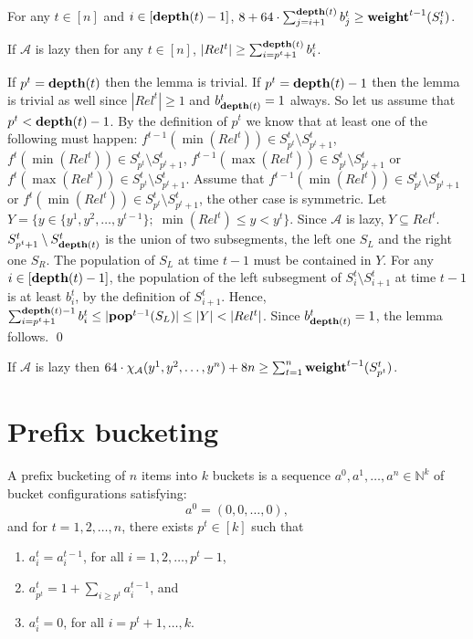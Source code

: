 \documentclass[runningheads,a4paper]{llncs}
\newcommand{\A}{\mathcal{A}}
\newcommand{\N}{\mathbb{N}}
\newcommand{\pop}{{\rm {\bf pop}}}
\newcommand{\weight}{{\rm {\bf weight}}}
\newcommand{\depth}{{\rm {\bf depth}}}
\renewenvironment{proof}{\noindent{\it Proof. }} {{\qed}}
\begin{document}
\begin{corollary}\label{c-weight}
For any $t\in[n]$ and $i\in[\depth(t)-1]$, $8 + 64 \cdot \sum_{j=i+1}^{\depth(t)} b^t_{j} \ge \weight^{t-1}(S^t_i)$.
\end{corollary}


\begin{lemma}
If $\A$ is lazy then for any $t\in[n]$, $|Rel^t| \ge \sum_{i=p^t+1}^{\depth(t)} b^t_i$.
\end{lemma}

\begin{proof}
If $p^t = \depth(t)$ then the lemma is trivial. If $p^t = \depth(t)-1$ then the lemma is trivial as well
since $|Rel^t|\ge 1$ and $b^t_{\depth(t)}=1$ always. So let us assume that $p^t < \depth(t)-1$.
By the definition of $p^t$ we know that at least one of the following must happen: $f^{t-1}(\min(Rel^t)) \in S^t_{p^t} \setminus S^t_{p^t+1}$, $f^{t}(\min(Rel^t)) \in S^t_{p^t} \setminus S^t_{p^t+1}$, $f^{t-1}(\max(Rel^t)) \in S^t_{p^t} \setminus S^t_{p^t+1}$ or $f^{t}(\max(Rel^t)) \in S^t_{p^t} \setminus S^t_{p^t+1}$. Assume that $f^{t-1}(\min(Rel^t)) \in S^t_{p^t} \setminus S^t_{p^t+1}$ or $f^{t}(\min(Rel^t)) \in S^t_{p^t} \setminus S^t_{p^t+1}$,
the other case is symmetric. Let $Y = \{ y \in \{y^1,y^2,\dots,y^{t-1}\};\; \min(Rel^t) \le y < y^t\}$. 
Since $\A$ is lazy,  $Y \subseteq Rel^t$. $S^t_{p^t+1} \setminus S^t_{\depth(t)}$ is the union of two subsegments, the left one $S_L$ and the right one $S_R$.
The population of $S_L$ at time $t-1$ must be contained in $Y$.
For any $i\in [\depth(t)-1]$, the population of the left subsegment of $S^t_i \setminus S^t_{i+1}$ at time $t-1$ is at least $b^t_i$, by the definition of $S^t_{i+1}$. 
Hence, $\sum_{i=p^t+1}^{\depth(t)-1} b^t_i \le |\pop^{t-1}(S_L)| \le |Y| < |Rel^t|$. Since $b^t_{\depth(t)}=1$, the lemma follows.
\end{proof}

\begin{corollary}\label{c-main}
If $\A$ is lazy then $64 \cdot \chi_\A(y^1,y^2,\dots,y^n) + 8n \ge \sum_{t=1}^n \weight^{t-1}(S^t_{p^t})$.
\end{corollary}


\section{Prefix bucketing}

A prefix bucketing of $n$ items into $k$ buckets is a sequence $a^0,a^1,\dots,a^n\in \N^k$ of bucket configurations
satisfying:
\[
a^0 = (0,0,\dots,0),
\]
and for $t=1,2,\dots,n$, there exists $p^{t} \in [k]$ such that
\begin{enumerate}
\item $a^t_i = a^{t-1}_i$, for all $i=1,2,\dots,p^{t}-1$, 
\item $a^t_{p^{t}} = 1+ \sum_{i\ge p^{t}} a^{t-1}_i$, and
\item $a^t_i = 0$, for all $i=p^{t}+1,\dots,k$.
\end{enumerate}
\end{document}

